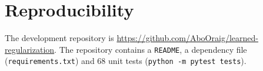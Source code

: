 \section*{Reproducibility}

The development repository is
\url{https://github.com/AboOraig/learned-regularization}. The repository contains a
\texttt{README}, a dependency file (\texttt{requirements.txt})
and 68 unit tests (\texttt{python -m pytest tests}).

